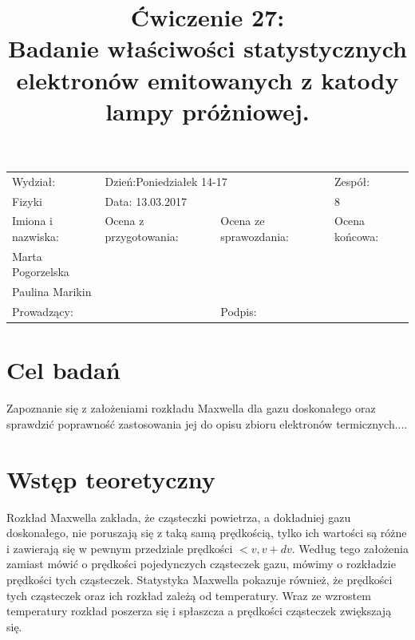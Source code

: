 \documentclass[a4paper,10pt]{article}
\def\arraystretch{1.2}
\begin{document}
\begin{table}
  \centering
  \def\arraystretch{1.5}
    \begin{tabular}{|l|l|l|l|} \hline
    Wydział:           & \multicolumn{2}{l|}{Dzień:Poniedziałek 14-17}    &Zespół:  \\
    Fizyki             &    \multicolumn{2}{l|}{Data: 13.03.2017}         &8             \\\hline
    Imiona i nazwiska: &Ocena z przygotowania:  &Ocena ze sprawozdania:   &Ocena końcowa: \\
    Marta Pogorzelska  &                        &                         &                \\
    Paulina Marikin    &                        &                         &\\\hline
    \multicolumn{2}{|l|}{Prowadzący:                 } &\multicolumn{2}{l|}{Podpis:             }  \\\hline
  \end{tabular}
\end{table}

\title{Ćwiczenie 27:\\Badanie właściwości statystycznych elektronów emitowanych z katody lampy próżniowej.}
\date{}
\maketitle{}

\section{Cel badań}
Zapoznanie się  z założeniami rozkładu Maxwella dla gazu doskonałego oraz sprawdzić poprawność zastosowania jej do opisu zbioru elektronów termicznych....

\section{Wstęp teoretyczny}
Rozkład Maxwella zakłada, że cząsteczki powietrza, a dokładniej gazu doskonałego, nie poruszają się z taką samą
prędkością, tylko ich  wartości są różne i zawierają się w pewnym przedziale prędkości $<v, v + dv$. Według tego założenia zamiast mówić o prędkości pojedynczych cząsteczek gazu, mówimy o rozkładzie prędkości tych cząsteczek. Statystyka Maxwella pokazuje również, że prędkości tych cząsteczek oraz ich rozkład zależą  od temperatury. Wraz ze wzrostem temperatury rozkład poszerza się i spłaszcza a prędkości cząsteczek zwiększają się.
\end{document}
